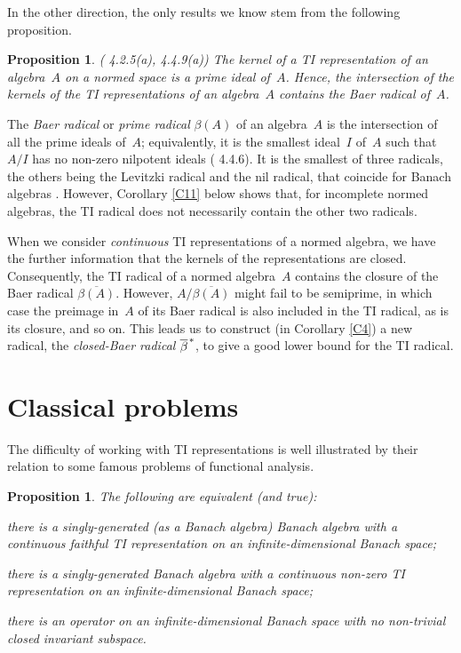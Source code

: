\documentclass[11pt]{article}
\newcounter{arbenum}
\newenvironment{arbenumerate}{\begin{list}{{\rm(\arabic{arbenum})}}%
{\usecounter{arbenum}}}{\end{list}}
\newcommand{\closure}[1]{\overline{#1}}
\newcommand{\bt}{\beta}
\newtheorem{prop}[thm]{Proposition}
\newcommand{\barstar}[1]{{\closure{#1}\kern 1pt}^*}
\begin{document}
In the other direction, the only results we know stem from the following
proposition.

\begin{prop}\label{P1} {\rm (\cite{Palmerbk} 4.2.5(a), 4.4.9(a))}
The kernel of a TI representation of an algebra~$A$ on a normed space is a prime
ideal of~$A$.   Hence, the intersection of the kernels of the TI representations of an algebra~$A$
contains the Baer radical of~$A$.
\end{prop}

The {\em Baer radical} or {\em prime radical} $\bt(A)$ of an algebra~$A$
is the intersection of all the prime ideals of~$A$; equivalently, it is the
smallest ideal~$I$ of~$A$ such that $A/I$ has no non-zero nilpotent ideals
(\cite{Palmerbk} 4.4.6).  It is the smallest of three radicals, the others being
the Levitzki radical and the nil radical, that coincide for Banach algebras
\cite{PGD7}.   However, Corollary \ref{C11} below shows that, for incomplete
normed algebras, the TI radical does not necessarily contain the other two
radicals.

When we consider {\em continuous} TI representations of a normed algebra,
we have the further information that the kernels of the representations are
closed.    Consequently, the TI radical of a normed algebra~$A$ contains the
closure of the Baer radical $\overline{\bt(A)}$.   However,
$A/\overline{\bt(A)}$ might fail to be semiprime, in which case the preimage
in~$A$ of its Baer radical is also included in the TI radical, as is its
closure, and so on.  This leads us to construct (in Corollary \ref{C4}) a new
radical, the {\em closed-Baer radical} $\barstar{\beta}$, to give a good lower
bound for the TI radical.

\section{Classical problems}\label{S4}

The difficulty of working with TI representations is well illustrated by their
relation to some famous problems of functional analysis.

\begin{prop} \label{P2}
The following are equivalent (and true):
\begin{arbenumerate}
\item there is a singly-generated (as a Banach algebra) Banach algebra with a
continuous faithful TI representation on an infinite-dimensional Banach space;
\item there is a singly-generated Banach algebra with a continuous non-zero TI
representation on an infinite-dimensional Banach space;
\item there is an operator on an infinite-dimensional Banach space with no
non-trivial closed invariant subspace.
\end{arbenumerate}
\end{prop}
\end{document}
